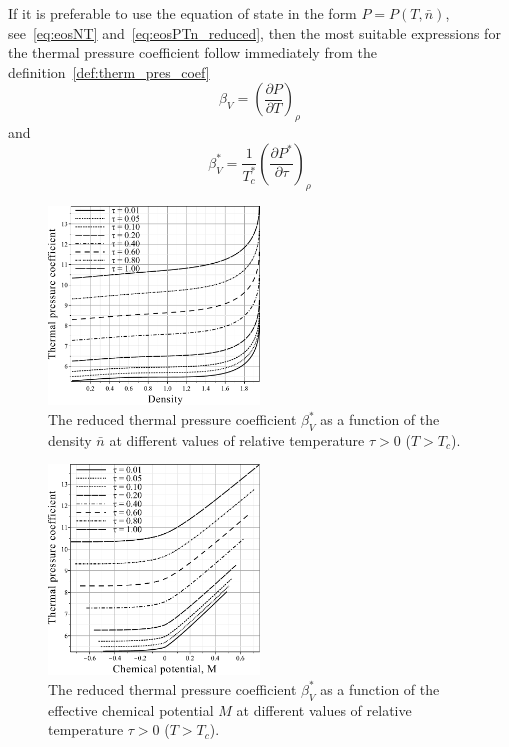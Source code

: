 \documentclass[12pt]{article}
\begin{document}
	If it is preferable to use the equation of state in the form $P=P(T, \bar{n})$, see~\eqref{eq:eosNT} and~\eqref{eq:eosPTn_reduced}, then the most suitable expressions for the thermal pressure coefficient follow immediately from the definition~\eqref{def:therm_pres_coef}
	\begin{equation}
		\beta_V = \left(\frac{\partial P}{\partial T}\right)_\rho
	\end{equation}
	and
	\begin{equation}
		\label{eq:beta_star_n}
		\beta^*_V = \frac{1}{T^*_c} \left(\frac{\partial P^*}{\partial \tau}\right)_{\rho}
	\end{equation}
	
	
	\begin{figure}[h!]
		\centering \includegraphics[width=0.5\textwidth]{f3a.pdf}
		\vskip-3mm\caption{The reduced thermal pressure coefficient $\beta^*_V$ as a function of the density $\bar n$ at different values of relative temperature $\tau > 0$ ($T > T_c$). 
		}\label{fig3a}
	\end{figure}
	\begin{figure}[h!]
		\centering \includegraphics[width=0.5\textwidth]{f3b.pdf}
		\vskip-3mm\caption{The reduced thermal pressure coefficient $\beta^*_V$ as a function of the effective chemical potential $M$ at different values of relative temperature $\tau > 0$ ($T > T_c$). 
		}\label{fig3b}
	\end{figure}
\end{document}
